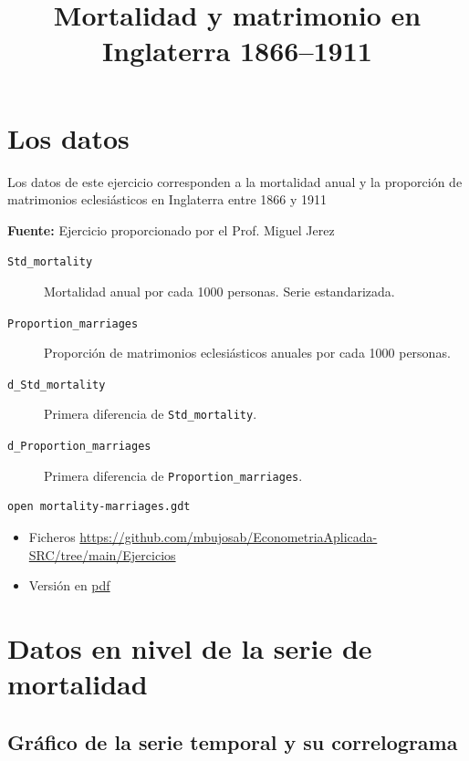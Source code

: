 \documentclass[10pt]{article}
\date{}
\title{Mortalidad y matrimonio en Inglaterra 1866--1911}
\begin{document}
\maketitle
\section*{Los datos}
\label{sec:orga651488}

Los datos de este ejercicio corresponden a la mortalidad anual y la
proporción de matrimonios eclesiásticos en Inglaterra entre 1866 y
1911 

\textbf{Fuente:} Ejercicio proporcionado por el Prof. Miguel Jerez

\begin{description}
\item[{\texttt{Std\_mortality}}] Mortalidad anual por cada 1000 personas. Serie estandarizada.
\item[{\texttt{Proportion\_marriages}}] Proporción de matrimonios eclesiásticos
anuales por cada 1000 personas.
\item[{\texttt{d\_Std\_mortality}}] Primera diferencia de \texttt{Std\_mortality}.
\item[{\texttt{d\_Proportion\_marriages}}] Primera diferencia de
\texttt{Proportion\_marriages}.
\end{description}

\begin{verbatim}
open mortality-marriages.gdt
\end{verbatim}

\begin{itemize}
\item Ficheros \url{https://github.com/mbujosab/EconometriaAplicada-SRC/tree/main/Ejercicios}
\item Versión en \href{https://github.com/mbujosab/EconometriaAplicada-SRC/blob/main/Ejercicios/mortality-marriages.pdf}{pdf}
\end{itemize}
\section*{Datos en nivel de la serie de mortalidad}
\label{sec:org707445b}

\subsection*{Gráfico de la serie temporal y su correlograma}
\label{sec:org2501914}
\end{document}
